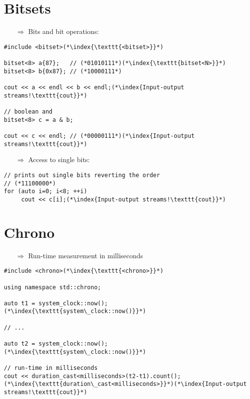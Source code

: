 \documentclass[10pt]{article}
\begin{document}
\section{Bitsets}
\small
\begin{enumerate}
\item[$\Rightarrow$] Bits and bit operations:
\end{enumerate}
\begin{lstlisting}
#include <bitset>(*\index{\texttt{<bitset>}}*)

bitset<8> a{87};   // (*01010111*)(*\index{\texttt{bitset<N>}}*)
bitset<8> b{0x87}; // (*10000111*)
    
cout << a << endl << b << endl;(*\index{Input-output streams!\texttt{cout}}*)
    
// boolean and
bitset<8> c = a & b;
    
cout << c << endl; // (*00000111*)(*\index{Input-output streams!\texttt{cout}}*)
\end{lstlisting}
\begin{enumerate}
\item[$\Rightarrow$] Access to single bits:
\end{enumerate}
\begin{lstlisting}
// prints out single bits reverting the order
// (*11100000*)
for (auto i=0; i<8; ++i)
     cout << c[i];(*\index{Input-output streams!\texttt{cout}}*)
\end{lstlisting}
%
%
\section{Chrono}
\small
\begin{enumerate}
\item[$\Rightarrow$] Run-time measurement in milliseconds
\end{enumerate}
\begin{lstlisting}
#include <chrono>(*\index{\texttt{<chrono>}}*)

using namespace std::chrono;

auto t1 = system_clock::now();(*\index{\texttt{system\_clock::now()}}*)

// ...

auto t2 = system_clock::now();(*\index{\texttt{system\_clock::now()}}*)

// run-time in milliseconds
cout << duration_cast<milliseconds>(t2-t1).count();(*\index{\texttt{duration\_cast<milliseconds>}}*)(*\index{Input-output streams!\texttt{cout}}*)
\end{lstlisting}
%
%
%
\end{document}

